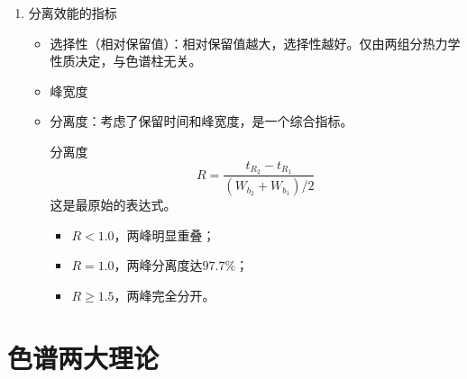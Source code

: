 \begin{enumerate}
	分配系数$K$：一定$T$、$p$，两相达平衡后，组分在固定相和流动相\footnote{流动相：moving phase；固定相：stationary phase}质量体积浓度的比值。	
	\begin{equation*}
		K=\dfrac{C_s}{C_m}
	\end{equation*}
	
	分配比$k$：一定$T$、$p$，两相达平衡后，组分在固定相质量（$p$）和流动相质量（$q$）的比值。
	\begin{equation*}
	k=\dfrac{p}{q}
	\end{equation*}
	
	$K$与$k$的关系\footnote{都是对于单个物质而言}：
	\begin{equation*}
	K=\dfrac{C_s}{C_m} =\dfrac{p/ V_s}{q/ V_M}=k \dfrac{V_0}{V_s}
	\end{equation*}
	\begin{theorem*}{$k$与保留值的关系}{}
	\begin{gather*}
		k=\dfrac{t'_R}{t_0} =\dfrac{t_R-t_0}{t_0}\\
		t_R=t_0 (1+k)		
	\end{gather*}
	\end{theorem*}
	
	\item 分离效能的指标
	\begin{itemize}
		\item 选择性（相对保留值）：相对保留值越大，选择性越好。仅由两组分热力学性质决定，与色谱柱无关。
		\item 峰宽度
		\item 分离度：考虑了保留时间和峰宽度，是一个综合指标。
		\begin{theorem*}{分离度}{}
			\begin{equation}
			R=\dfrac{t_{R_2}-t_{R_1}}{(W_{b_2}+W_{b_1})/2}\label{eqn:1.1}
			\end{equation}
			这是最原始的表达式。
		\end{theorem*}
		
				
		\begin{itemize}
			\item $R<1.0$，两峰明显重叠；
			\item $R=1.0$，两峰分离度达$97.7\%$；
			\item $R\geqslant 1.5$，两峰完全分开。
		\end{itemize}
	\end{itemize}
\end{enumerate}

\section{色谱两大理论}

